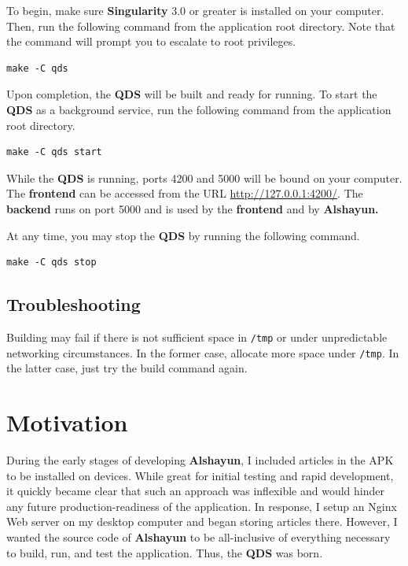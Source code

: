 \documentclass[12pt]{report}
\begin{document}
To begin, make sure \textbf{Singularity} 3.0 \cite{singularity3inst} or greater
is installed on your computer. Then, run the following command from the
application root directory. Note that the command will prompt you to escalate to
root privileges.

\begin{verbatim}
make -C qds
\end{verbatim}

Upon completion, the \textbf{QDS} will be built and ready for running. To start
the \textbf{QDS} as a background service, run the following command from the
application root directory.

\begin{verbatim}
make -C qds start
\end{verbatim}

While the \textbf{QDS} is running, ports 4200 and 5000 will be bound on your
computer. The \textbf{frontend} can be accessed from the URL
\url{http://127.0.0.1:4200/}. The \textbf{backend} runs on port 5000 and is used
by the \textbf{frontend} and by \textbf{Alshayun.}

At any time, you may stop the \textbf{QDS} by running the following command.

\begin{verbatim}
make -C qds stop
\end{verbatim}

        \subsection{Troubleshooting}

Building may fail if there is not sufficient space in \texttt{/tmp} or under
unpredictable networking circumstances. In the former case, allocate more space
under \texttt{/tmp}. In the latter case, just try the build command again.

    \section{Motivation}

During the early stages of developing \textbf{Alshayun}, I included articles in
the APK to be installed on devices. While great for initial testing and rapid
development, it quickly became clear that such an approach was inflexible and
would hinder any future production-readiness of the application. In response, I
setup an Nginx Web server on my desktop computer and began storing articles
there. However, I wanted the source code of \textbf{Alshayun} to be
all-inclusive of everything necessary to build, run, and test the application.
Thus, the \textbf{QDS} was born.
\end{document}
